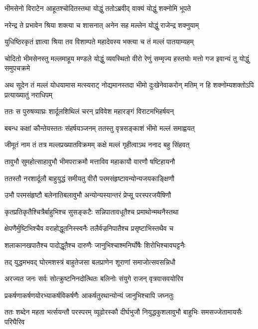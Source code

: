 \twolineshloka
{भीमसेनो विराटेन आहूतश्चोदितस्तथा}
{योद्धुं ततोऽब्रवीद् वाक्यं योद्धुं शक्नोमि भूपते}


\twolineshloka
{नरेन्द्र ते प्रभावेन श्रिया शक्त्या च शासनात्}
{अनेन सह मल्लेन योद्धुं राजेन्द्र शक्नुयाम्}


\twolineshloka
{युधिष्ठिरकृतं ज्ञात्वा श्रिया तव विशाम्पते}
{महादेवस्य भक्त्या च तं मल्लं पातयाम्यहम्}



\threelineshloka
{चोदितो भीमसेनस्तु मल्लमाहूय मण्डले}
{योद्धुं व्यवस्थितो वीरो रेणुं सम्मृज्य हस्तयोः}
{मत्तो गज इवान्यं तु योद्धुं समुपचक्रमे}


\onelineshloka
{अथ सूदेन तं मल्लं योधयामास मत्स्यराट्}
\twolineshloka
{नोद्यमानस्तदा भीमो दुःखेनेवाकरोन् मतिम्}
{न हि शक्नोम्यशक्तोऽपि प्रत्याख्यातुं नराधिपम्}


\twolineshloka
{ततः स पुरुषव्याघ्रः शार्दूलशिथिलं चरन्}
{प्रविवेश महारङ्गं विराटमभिहर्षयन्}


\twolineshloka
{बबन्ध कक्षां कौन्तेयस्ततः संहर्षयञ्जनम्}
{ततस्तु वृत्रसङ्काशं भीमो मल्लं समाह्वयत्}


\twolineshloka
{जीमूतं नाम तं तत्र मल्लप्रख्यातविक्रमम्}
{कक्षे मल्लं गृहीत्वाऽथ ननाद बहु सिंहवत्}


\twolineshloka
{तावुभौ सुमहोत्साहावुभौ भीमपराक्रमौ}
{मत्ताविव महाकायौ वारणौ षष्टिहायनौ}


\twolineshloka
{ततस्तौ नरशार्दूलौ बाहुयुद्धं समीयतु}
{वीरौ परमसंहृष्टावन्योन्यजयकाङ्क्षिणौ}


\twolineshloka
{उभौ परमसंहृष्टौ बलेनातिबलावुभौ}
{अन्योन्यस्यान्तरं प्रेप्सू परस्परजयैषिणौ}


\twolineshloka
{कृतप्रतिकृतैश्चित्रैर्बाहुभिश्च सुसङ्कटैः}
{सन्निपातावधूतैश्च प्रमाथोन्मथनैस्तथा}


\twolineshloka
{क्षेपणैर्मुष्टिभिश्चैव वराहोद्धूतनिस्स्वनैः}
{तलैर्वज्रनिपातैश्च प्रसृष्टाभिस्तथैव च}


\twolineshloka
{शलाकानखपातैश्च पादोद्धूतैश्च दारुणैः}
{जानुभिश्चाश्मनिर्घोषैः शिरोभिश्चावघट्टनैः}


\twolineshloka
{तद् युद्धमभवद् घोरमशस्त्रं बाहुतेजसा}
{बलप्राणेन शूराणां समाजोत्सवसन्निधौ}


\twolineshloka
{अरज्यत जनः सर्वः सोत्क्रुष्टनिनदोत्थितः}
{बलिनोः संयुगे राजन् वृत्रवासवयोरिव}


\twolineshloka
{प्रकर्षणाकर्षणयोरभ्याकर्षविकर्षणैः}
{आकर्षतुरथान्योन्यं जानुभिश्चापि जघ्नतुः}


\threelineshloka
{ततः शब्देन महता भर्त्सयन्तौ परस्परम्}
{व्यूढोरस्कौ दीर्घभुजौ नियुद्धकुशलावुभौ}
{बाहुभिः समसज्जेतामायसैः परिघैरिव}


